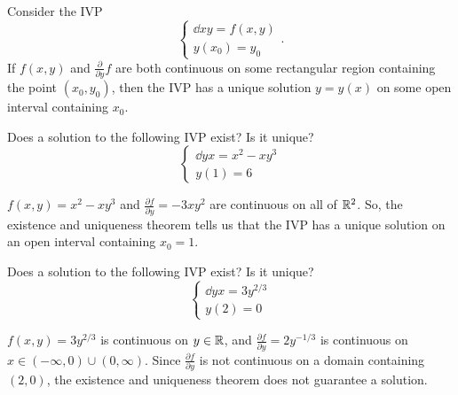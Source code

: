 \begin{theorem}
	Consider the IVP
	\begin{equation*}
		\begin{cases}
			\dd{x}{y} = f(x,y) \\
			y(x_0) = y_0
		\end{cases}.
	\end{equation*}
	If $f(x,y)$ and $\frac{\partial}{\partial y}f$ are both continuous on some rectangular region containing the point $(x_0, y_0)$, then the IVP has a unique solution $y = y(x)$ on some open interval containing $x_0$.
\end{theorem}

\begin{example}
	Does a solution to the following IVP exist? Is it unique?
	\begin{equation*}
		\begin{cases}
			\dd{y}{x} = x^2 - xy^3 \\
			y(1) = 6
		\end{cases}
	\end{equation*}
\end{example}
\noindent
$f(x,y) = x^2 - xy^3$ and $\frac{\partial f}{\partial y} = -3xy^2$ are continuous on all of $\mathbb{R}^2$. So, the existence and uniqueness theorem tells us that the IVP has a unique solution on an open interval containing $x_0 = 1$.

\begin{example}
	Does a solution to the following IVP exist? Is it unique?
	\begin{equation*}
		\begin{cases}
			\dd{y}{x} = 3y^{2/3} \\
			y(2) = 0
		\end{cases}
	\end{equation*}
\end{example}
\noindent
$f(x,y) = 3y^{2/3}$ is continuous on $y \in \mathbb{R}$, and $\frac{\partial f}{\partial y} = 2y^{-1/3}$ is continuous on $x \in \left(-\infty, 0\right) \cup \left(0, \infty\right)$. Since $\frac{\partial f}{\partial y}$ is not continuous on a domain containing $(2,0)$, the existence and uniqueness theorem does not guarantee a solution.